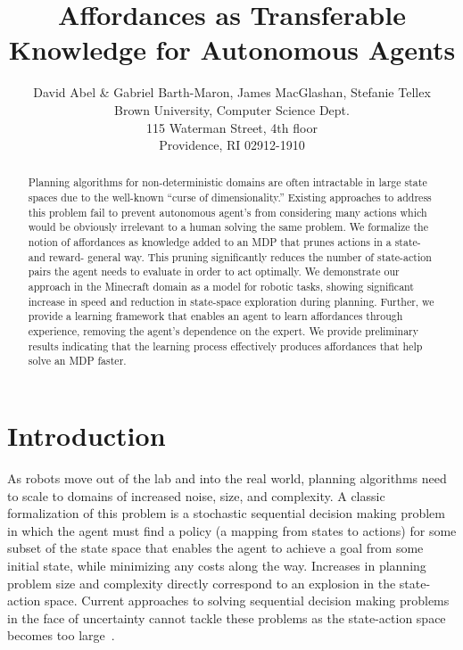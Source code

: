 \documentclass[letterpaper]{article}
\begin{document}

\title{Affordances as Transferable Knowledge for Autonomous Agents}
\author{David Abel \& Gabriel Barth-Maron, James MacGlashan, Stefanie Tellex\\
Brown University, Computer Science Dept. \\
115 Waterman Street, 4th floor \\
Providence, RI 02912-1910}


\maketitle
\begin{abstract}
Planning algorithms for non-deterministic domains are often
intractable in large state spaces due to the well-known ``curse of
dimensionality.'' Existing approaches to address this problem fail to
prevent autonomous agent's from considering many actions which would be
obviously irrelevant to a human solving the same problem. We formalize the notion of affordances
as knowledge added to an MDP that prunes actions in a state- and reward- general
way. This pruning significantly reduces the number of state-action
pairs the agent needs to evaluate in order to act optimally. We
demonstrate our approach in the Minecraft domain as a model for robotic tasks, showing significant
increase in speed and reduction in state-space exploration during planning. Further, we provide a
learning framework that enables an agent to learn affordances through
experience, removing the agent's dependence on the expert. We provide
preliminary results indicating that the learning process effectively
produces affordances that help solve an MDP faster.
\end{abstract}

\section{Introduction}
\label{sec:introduction}

As robots move out of the lab and into the real world, planning
algorithms need to scale to domains of increased noise, size, and
complexity.  A classic formalization of this problem is a stochastic
sequential decision making problem in which the agent must find a
policy (a mapping from states to actions) for some subset of the state
space that enables the agent to achieve a goal from some initial
state, while minimizing any costs along the way.
Increases in planning problem size and complexity directly correspond
to an explosion in the state-action space. Current approaches to solving 
sequential decision making problems in the face of uncertainty cannot tackle these problems 
as the state-action space becomes too large~\cite{grounds05}.
\end{document}
